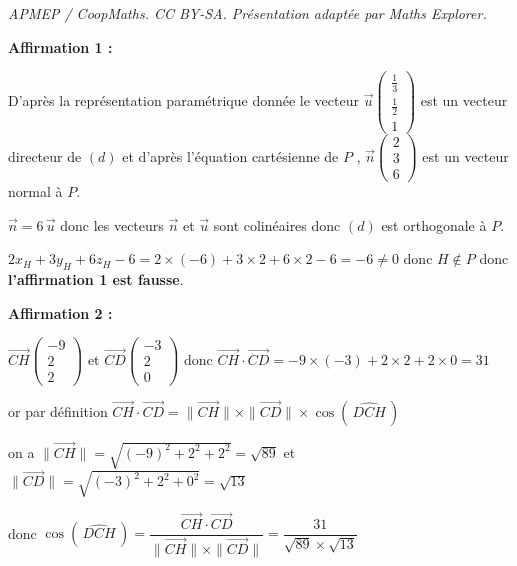 \documentclass[10pt]{article}
\begin{document}
\noindent\textit{APMEP / CoopMaths. CC BY-SA. Présentation adaptée par Maths Explorer.}\par\medskip
\medskip

\textbf{Affirmation 1 :} 

D'après la représentation paramétrique donnée le vecteur $\overrightarrow{u} \begin{pmatrix}  \frac{1}{3} \\  \frac{1}{2}  \\1 \end{pmatrix}$ est un vecteur directeur de $(d)$ et d'après l'équation cartésienne de $P$ , $\overrightarrow{n} \begin{pmatrix}  2 \\  3  \\6 \end{pmatrix}$  est un vecteur normal à $P$.

$\overrightarrow{n}=6\,\overrightarrow{u}$ donc les vecteurs $\overrightarrow{n}$ et $\overrightarrow{u}$ sont colinéaires donc $(d)$ est orthogonale à $P$.

$2x_H + 3y_H + 6z_H - 6 = 2 \times (-6)+3 \times 2 + 6 \times 2 -6=-6 \neq 0 $ donc $H \notin P$ donc \textbf{ l'affirmation 1 est fausse}.
 

\textbf{Affirmation 2 :}  

$\overrightarrow{CH} \begin{pmatrix} -9 \\ 2 \\ 2 \end{pmatrix}$ et $\overrightarrow{CD} \begin{pmatrix} -3 \\2\\0 \end{pmatrix}$ donc $\overrightarrow{CH} \cdot \overrightarrow{CD}=-9 \times (-3) + 2\times 2 + 2 \times 0=31$

or par définition $\overrightarrow{CH} \cdot \overrightarrow{CD} = \| \overrightarrow{CH} \| \times \| \overrightarrow{CD} \| \times \cos \left( \, \widehat{DCH}\,\right)$

on a  $\| \overrightarrow{CH} \| = \sqrt{(-9)^2+2^2+2^2}=\sqrt{89}$ et $\| \overrightarrow{CD} \| = \sqrt{(-3)^2+2^2+0^2}=\sqrt{13}$ 

donc $\cos \left( \,\widehat{DCH}\,\right) = \dfrac{\overrightarrow{CH} \cdot \overrightarrow{CD} }{ \| \overrightarrow{CH} \| \times \| \overrightarrow{CD} \|}= \dfrac{31}{\sqrt{89} \times \sqrt{13}} $ 
\end{document}
